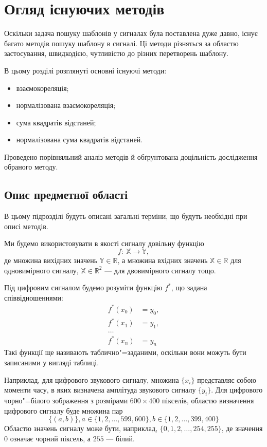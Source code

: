 \chapter{Огляд існуючих методів}

Оскільки задача пошуку шаблонів у сигналах була поставлена дуже давно, існує багато методів пошуку шаблону в сигналі.
Ці методи різняться за областю застосування, швидкодією, чутливістю до різних перетворень шаблону.

В цьому розділі розглянуті основні існуючі методи:
\begin{itemize}
    \item взаємокореляція;
    \item нормалізована взаємокореляція;
    \item сума квадратів відстаней;
    \item нормалізована сума квадратів відстаней.
\end{itemize}

Проведено порівняльний аналіз методів й обґрунтована доцільність дослідження обраного методу.

\section{Опис предметної області}
    В цьому підрозділі будуть описані загальні терміни, що будуть необхідні при описі методів.

    Ми будемо використовувати в якості сигналу довільну функцію
    \begin{equation*}
        f:\:\mathbb{X} \rightarrow \mathbb{Y},
    \end{equation*}
    де множина вихідних значень $\mathbb{Y} \in \mathbb{R}$, а множина
    вхідних значень $\mathbb{X} \in \mathbb{R}$ для одновимірного сигналу, $\mathbb{X} \in \mathbb{R}^2$ --- для
    двовимірного сигналу тощо.

    Під цифровим сигналом будемо розуміти функцію $f^*$, що задана співвідношеннями:
    \begin{align*}
        f^*(x_0) &= y_0,\\
        f^*(x_1) &= y_1,\\
        \dots\\
        f^*(x_n) &= y_n
    \end{align*}
    Такі функції ще називають таблично"=заданими, оскільки вони можуть бути записаними у вигляді таблиці.

    Наприклад, для цифрового звукового сигналу, множина $\{x_i\}$ представляє собою моменти часу, в яких визначена
    амплітуда звукового сигналу $\{y_i\}$.
    Для цифрового чорно"=білого зображення з розмірами $600 \times 400$ пікселів, областю визначення цифрового сигналу
    буде множина пар
    \[\{ (a, b) \}, a \in \{1,2,\dots,599,600\}, b \in \{1,2,\dots,399,400\}\]
    Областю значень сигналу може бути, наприклад, $\{0,1,2,\dots,254,255\}$, де значення $0$ означає чорний піксель, а
    $255$ --- білий.

